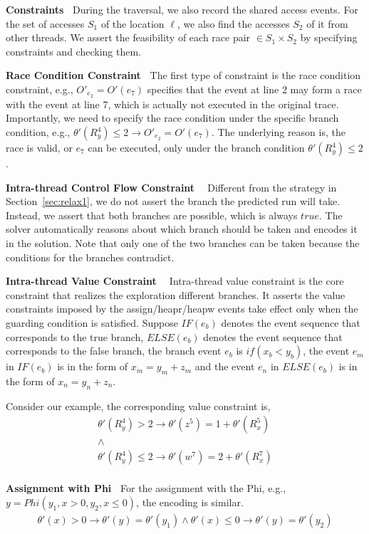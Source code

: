 {\bf Constraints\ } During the traversal, we also record the shared access events.  For the set of accesses $S_1$ of the location $\ell$, we also find the accesses $S_2$ of it from other threads. We assert the feasibility of each race pair $\in S_1 \times S_2$ by specifying constraints and checking them.

{\bf Race Condition Constraint\ }  The first type of constraint is the race condition constraint, e.g., $O'_{e_2}=O'(e_7)$ specifies that the event at line 2 may form a race with the event at line 7, which is actually not executed in the original trace. Importantly, we need to specify the race condition under the specific branch condition, e.g., $\theta'(R^4_y)\leq 2\rightarrow O'_{e_2}=O'(e_7)$. The underlying reason is, the race is valid, or $e_7$ can be executed,  only under the branch condition $\theta'(R^4_y)\leq 2$. 

{\bf Intra-thread Control Flow Constraint \ } Different from the strategy in Section~\ref{sec:relax1}, we do not assert the branch the predicted run will take. Instead, we assert that both branches are possible, which is always $true$. The solver automatically reasons about which branch should be taken and encodes it in the solution. Note that only one of the two branches can be taken because the conditions for the branches contradict.

{\bf Intra-thread Value Constraint \ } Intra-thread value constraint is the core constraint that realizes the exploration different branches. It asserts the value constraints imposed by the {\sf assign/heapr/heapw} events take effect only when the guarding condition is satisfied. 
Suppose $IF(e_b)$ denotes the event sequence that corresponds to the true branch, $ELSE(e_b)$ denotes the event sequence that corresponds to the false branch, the branch event $e_b$ is  $if(x_b<y_b)$, the event $e_m$ in $IF(e_b)$ is in the form of $x_m=y_m+z_m$ and the event $e_n$ in $ELSE(e_b)$ is in the form of $x_n=y_n+z_n$.




Consider our example, the corresponding value constraint is, 
$$
\begin{array}{l}
\theta'(R^4_y)>2 \rightarrow \theta'(z^5)=1+\theta'(R^5_x) \\ 
\wedge  \\
\theta'(R^4_y)\leq 2 \rightarrow  \theta'(w^7)=2+\theta'(R^{7}_{x})\\
\end{array}
$$

{\bf Assignment with {\sf Phi}\ }  For the assignment with the Phi, e.g., $y=Phi(y_1, x>0, y_2, x\leq 0)$, the encoding is similar.
$$
\begin{array}{l}
\theta'(x)>0 \rightarrow \theta'(y)=\theta'(y_1) \wedge \theta'(x)\leq 0 \rightarrow \theta'(y)=\theta'(y_2)
\end{array}
$$

